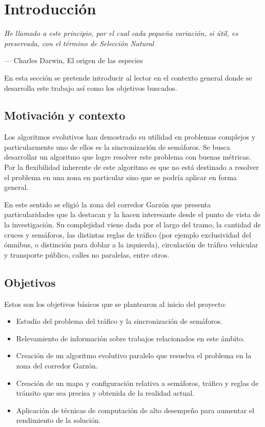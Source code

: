 \chapter{Introducción}
\epigraph{ \textit{He llamado a este principio, por el cual cada pequeña variación, si útil, es preservada, con el término de Selección Natural}}{--- Charles Darwin, El origen de las especies}

En esta sección se pretende introducir al lector en el contexto general donde se desarrolla este trabajo así como los objetivos buscados.

\section{Motivación y contexto}

Los algoritmos evolutivos han demostrado su utilidad en problemas complejos y particularmente uno de ellos es la sincronización de semáforos. Se busca desarrollar un algoritmo que logre resolver este problema con buenas métricas.
Por la flexibilidad inherente de este algoritmo es que no está destinado a resolver el problema en una zona en particular sino que se podría aplicar en forma general.

En este sentido se eligió la zona del corredor Garzón que presenta particularidades que la destacan y la hacen interesante desde el punto de vista de la investigación. Su complejidad viene dada por el largo del tramo, la cantidad de cruces y semáforos, las distintas reglas de tráfico (por ejemplo exclusividad del ómnibus, o distinción para doblar a la izquierda), circulación de tráfico vehicular y transporte público, calles no paralelas, entre otros.




\section{Objetivos}

Estos son los objetivos básicos que se plantearon al inicio del  proyecto:

\begin{itemize}
	\item Estudio del problema del tráfico y la sincronización de semáforos.
	\item Relevamiento de información sobre trabajos relacionados en este ámbito.
	\item Creación de un algoritmo evolutivo paralelo que resuelva el problema en la zona del corredor Garzón.
	\item Creación de un mapa y  configuración relativa a semáforos, tráfico y reglas de tránsito que sea precisa y obtenida de la realidad actual.	
	\item Aplicación de técnicas de computación de alto desempeño para aumentar el rendimiento de la solución.

\end{itemize}

